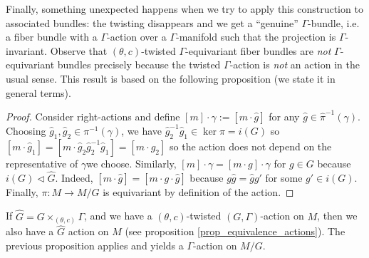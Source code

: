 Finally, something unexpected happens when we try to apply this construction to associated bundles: the twisting disappears and we get a ``genuine'' \(\Gamma\)-bundle, i.e. a fiber bundle with a \(\Gamma\)-action over a \(\Gamma\)-manifold such that the projection is \(\Gamma\)-invariant. Observe that \((\theta,c)\)-twisted \(\Gamma\)-equivariant fiber bundles are \textit{not} \(\Gamma\)-equivariant bundles precisely because the twisted \(\Gamma\)-action is \textit{not} an action in the usual sense. This result is based on the following proposition (we state it in general terms).

\begin{proof}
    Consider right-actions and define \([m]\cdot \gamma:=[m\cdot \hat{g}]\) for any \(\hat{g}\in \hat{\pi}^{-1}(\gamma)\). Choosing \(\hat{g}_1, \hat{g}_2 \in \pi^{-1}(\gamma)\), we have \(\hat{g}_2^{-1} \hat{g}_1\in \ker\pi = i(G)\) so \([m\cdot \hat{g}_1]=[m\cdot \hat{g}_2\hat{g}_2^{-1}\hat{g}_1]=[m\cdot \hat{g}_2]\) so the action does not depend on the representative of \(\gamma\)we choose. Similarly, \([m]\cdot \gamma=[m\cdot g]\cdot \gamma\) for \(g\in G\) because \(i(G) \triangleleft \hat{G}\). Indeed, \([m\cdot \hat{g}]=[m\cdot g \cdot \hat{g}]\) because \(g\hat{g}=\hat{g}g'\) for some \(g'\in i(G)\). Finally, \(\pi\colon M \to M/G\) is equivariant by definition of the action.
\end{proof}

If \(\hat{G}=G \times_{(\theta, c)}\Gamma\), and we have a \((\theta,c)\)-twisted \((G, \Gamma)\)-action on \(M\), then we also have a \(\hat{G}\) action on \(M\) (see proposition \ref{prop_equivalence_actions}). The previous proposition applies and yields a \(\Gamma\)-action on \(M/G\).


